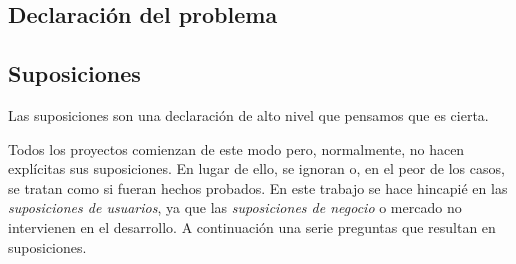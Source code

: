 \subsection{Declaración del problema}



\subsection{Suposiciones}
Las suposiciones son una declaración de alto nivel que pensamos que es cierta.

Todos los proyectos comienzan de este modo pero, normalmente, no hacen explícitas sus suposiciones. En lugar de ello, se ignoran o, en el peor de los casos, se tratan como si fueran hechos probados. En este trabajo se hace hincapié en las \textit{suposiciones de usuarios}, ya que las \textit{suposiciones de negocio} o mercado no intervienen en el desarrollo. A continuación una serie preguntas que resultan en suposiciones.


